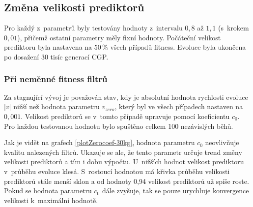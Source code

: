 \subsection{Změna velikosti prediktorů}

Pro každý z~parametrů byly testovány hodnoty z~intervalu $0,8$ až $1,1$ (s~krokem $0,01$), přičemž ostatní parametry měly fixní hodnoty. Počáteční velikost prediktoru byla nastavena na 50\,\% všech případů fitness. Evoluce byla ukončena po dosažení 30 tisíc generací CGP.

\subsubsection*{Při neměnné fitness filtrů}

Za stagnující vývoj je považován stav, kdy je absolutní hodnota rychlosti evoluce $|v|$ nižší než hodnota parametru $v_\mathit{zero}$, který byl ve všech případech nastaven na $0,001$. Velikost prediktorů se v~tomto případě upravuje pomocí koeficientu $c_0$. Pro každou testovanou hodnotu bylo spuštěno celkem 100 nezávislých běhů.

Jak je vidět na grafech \ref{plotZerocoef-30kg}, hodnota parametru $c_0$ neovlivňuje kvalitu nalezených filtrů. Ukazuje se ale, že tento parametr určuje trend změny velikosti prediktorů a tím i dobu výpočtu. U~nižších hodnot velikost prediktoru v~průběhu evoluce klesá. S~rostoucí hodnotou má křivka průběhu velikosti prediktorů stále menší sklon a od hodnoty 0,94 velikost prediktorů už spíše roste. Pokud se hodnota parametru $c_0$ dále zvyšuje, tak se pouze urychluje konvergence velikosti k~maximální hodnotě.

